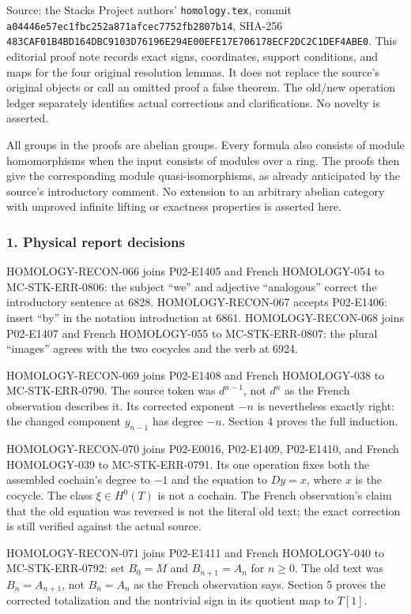 \documentclass[11pt]{article}
\begin{document}
Source: the Stacks Project authors' \texttt{homology.tex}, commit \texttt{a04446e57ec1fbc252a871afcec7752fb2807b14}, SHA-256 \texttt{483CAF01B4BD164DBC9103D76196E294E00EFE17E706178ECF2DC2C1DEF4ABE0}. This editorial proof note records exact signs, coordinates, support conditions, and maps for the four original resolution lemmas. It does not replace the source's original objects or call an omitted proof a false theorem. The old/new operation ledger separately identifies actual corrections and clarifications. No novelty is asserted.

All groups in the proofs are abelian groups. Every formula also consists of module homomorphisms when the input consists of modules over a ring. The proofs then give the corresponding module quasi-isomorphisms, as already anticipated by the source's introductory comment. No extension to an arbitrary abelian category with unproved infinite lifting or exactness properties is asserted here.

\subsubsection{1. Physical report decisions}\label{physical-report-decisions}

HOMOLOGY-RECON-066 joins P02-E1405 and French HOMOLOGY-054 to MC-STK-ERR-0806: the subject ``we'' and adjective ``analogous'' correct the introductory sentence at 6828. HOMOLOGY-RECON-067 accepts P02-E1406: insert ``by'' in the notation introduction at 6861. HOMOLOGY-RECON-068 joins P02-E1407 and French HOMOLOGY-055 to MC-STK-ERR-0807: the plural ``images'' agrees with the two cocycles and the verb at 6924.

HOMOLOGY-RECON-069 joins P02-E1408 and French HOMOLOGY-038 to MC-STK-ERR-0790. The source token was \(d^{n-1}\), not \(d^n\) as the French observation describes it. Its corrected exponent \(-n\) is nevertheless exactly right: the changed component \(y_{n-1}\) has degree \(-n\). Section 4 proves the full induction.

HOMOLOGY-RECON-070 joins P02-E0016, P02-E1409, P02-E1410, and French HOMOLOGY-039 to MC-STK-ERR-0791. Its one operation fixes both the assembled cochain's degree to \(-1\) and the equation to \(Dy=x\), where \(x\) is the cocycle. The class \(\xi\in H^0(T)\) is not a cochain. The French observation's claim that the old equation was reversed is not the literal old text; the exact correction is still verified against the actual source.

HOMOLOGY-RECON-071 joins P02-E1411 and French HOMOLOGY-040 to MC-STK-ERR-0792: set \(B_0=M\) and \(B_{n+1}=A_n\) for \(n\geq0\). The old text was \(B_n=A_{n+1}\), not \(B_n=A_n\) as the French observation says. Section 5 proves the corrected totalization and the nontrivial sign in its quotient map to \(T[1]\).
\end{document}
